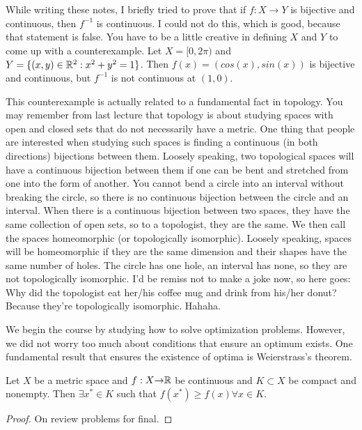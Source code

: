 \begin{remark}
  While writing these notes, I briefly tried to prove that if $f:X \to
  Y$ is bijective and continuous, then $f^{-1}$ is continuous. I could
  not do this, which is good, because that statement is false. You have
  to be a little creative in defining $X$ and $Y$ to come up with a
  counterexample. Let $X = [0,2\pi)$ and $Y = \{(x,y) \in \mathbb{R}^2: x^2 +
  y^2 = 1 \}$. Then $f(x) = (cos(x), sin(x))$ is bijective and
  continuous, but $f^{-1}$ is not continuous at $(1,0)$. 
  
  This counterexample is actually related to a fundamental fact in
  topology. You may remember from last lecture that topology is about
  studying spaces with open and closed sets that do not necessarily
  have a metric. One thing that people are interested when studying
  such spaces is finding a continuous (in both directions) bijections
  between them. Loosely speaking, two topological spaces will have a
  continuous bijection between them if one can be bent and stretched
  from one into the form of another. You cannot bend a circle into an
  interval without breaking the circle, so there is no continuous
  bijection between the circle and an interval. When there is a
  continuous bijection between two spaces, they have the same
  collection of open sets, so to a topologist, they are the same. We
  then call the spaces homeomorphic (or topologically
  isomorphic). Loosely speaking, spaces will be homeomorphic if they
  are the same dimension and their shapes have the same number of
  holes.  The circle has one hole, an interval has none, so they are
  not topologically isomorphic. I'd be remiss not to make a joke now,
  so here goes: Why did the topologist eat her/his coffee mug and
  drink from his/her donut?  Because they're topologically
  isomorphic. Hahaha.
\end{remark}

We begin the course by studying how to solve optimization
problems. However, we did not worry too much about conditions that
ensure an optimum exists. One fundamental result that ensures the
existence of optima is Weierstrass's theorem.
\begin{theorem}[Weierstrass]
  Let $X$ be a metric space and $f:X {\rightarrow} \mathbb{R}$ be continuous and
  $K \subset X$ be compact and nonempty. Then $\exists x^* \in K$ such
  that $f(x^*) \geq f(x) \forall x \in K$.
\end{theorem}
\begin{proof}
  On review problems for final.
\end{proof}

